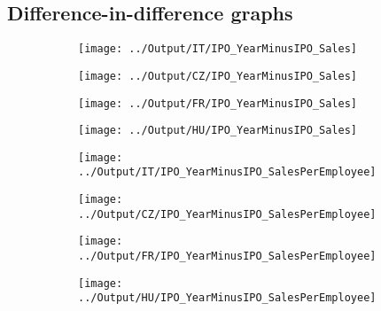 \documentclass[12pt,notitlepage]{article}
\begin{document}
\subsection*{Difference-in-difference graphs}


\begin{figure}[!htpb]
\centering
\caption{IPO and Sales}
\begin{subfigure}{.49\textwidth}
    \centering
 \texttt{[image: ../Output/IT/IPO\_YearMinusIPO\_Sales]}
\end{subfigure}%
\begin{subfigure}{.49\textwidth}
    \centering
 \texttt{[image: ../Output/CZ/IPO\_YearMinusIPO\_Sales]}
\end{subfigure}
\begin{subfigure}{.49\textwidth}
    \centering
 \texttt{[image: ../Output/FR/IPO\_YearMinusIPO\_Sales]}
\end{subfigure}%
\begin{subfigure}{.49\textwidth}
    \centering
 \texttt{[image: ../Output/HU/IPO\_YearMinusIPO\_Sales]}
\end{subfigure}
\end{figure}
\pagebreak

\begin{figure}[!htpb]
\centering
\caption{IPO and Sales per Employee}
\begin{subfigure}{.49\textwidth}
    \centering
 \texttt{[image: ../Output/IT/IPO\_YearMinusIPO\_SalesPerEmployee]}
\end{subfigure}%
\begin{subfigure}{.49\textwidth}
    \centering
 \texttt{[image: ../Output/CZ/IPO\_YearMinusIPO\_SalesPerEmployee]}
\end{subfigure}
\begin{subfigure}{.49\textwidth}
    \centering
 \texttt{[image: ../Output/FR/IPO\_YearMinusIPO\_SalesPerEmployee]}
\end{subfigure}%
\begin{subfigure}{.49\textwidth}
    \centering
 \texttt{[image: ../Output/HU/IPO\_YearMinusIPO\_SalesPerEmployee]}
\end{subfigure}
\end{figure}
\pagebreak
\end{document}
